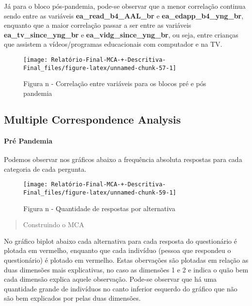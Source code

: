 \documentclass[
]{article}
\begin{document}
Já para o bloco pós-pandemia, pode-se observar que a menor correlação
continua sendo entre as variáveis \textbf{ea\_read\_b4\_AAL\_br} e
\textbf{ea\_edapp\_b4\_yng\_br}, enquanto que a maior correlação passar
a ser entre as variáveis \textbf{ea\_tv\_since\_yng\_br} e
\textbf{ea\_vidg\_since\_yng\_br}, ou seja, entre crianças que assistem
a vídeos/programas educacionais com computador e na TV.

\begin{figure}

{\centering \texttt{[image: Relatório-Final-MCA-+-Descritiva-Final\_files/figure-latex/unnamed-chunk-57-1]} 

}

\caption{Figura n - Correlação entre variáveis para os blocos pré e pós pandemia}\label{fig:unnamed-chunk-57}
\end{figure}

\hypertarget{multiple-correspondence-analysis-2}{%
\subsection{Multiple Correspondence
Analysis}\label{multiple-correspondence-analysis-2}}

\hypertarget{pruxe9-pandemia-2}{%
\paragraph{\texorpdfstring{\textbf{Pré
Pandemia}}{Pré Pandemia}}\label{pruxe9-pandemia-2}}

Podemos observar nos gráficos abaixo a frequência absoluta respostas
para cada categoria de cada pergunta.

\begin{figure}

{\centering \texttt{[image: Relatório-Final-MCA-+-Descritiva-Final\_files/figure-latex/unnamed-chunk-59-1]} 

}

\caption{Figura n - Quantidade de respostas por alternativa}\label{fig:unnamed-chunk-59}
\end{figure}

\begin{quote}
Construindo o MCA
\end{quote}

No gráfico biplot abaixo cada alternativa para cada resposta do
questionário é plotada em vermelho, enquanto que cada indivíduo (pessoa
que respondeu o questionário) é plotado em vermelho. Estas obervações
são plotadas em relação as duas dimensões mais explicativas, no caso as
dimensões 1 e 2 e indica o quão bem cada dimensão explica aquele
observação. Pode-se observar que há uma quantidade grande de indivíduos
no canto inferior esquerdo do gráfico que não são bem explicados por
pelas duas dimensões.
\end{document}
